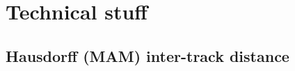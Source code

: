 \documentclass{bioinfo}
\begin{document}


\section{Technical stuff}

\subsection{Hausdorff (MAM) inter-track distance\label{sec:Hausdorff}}
\end{document}
